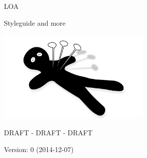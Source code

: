 \clearpage
\thispagestyle{empty}
\begin{centering}
\bfont
\Huge{LOA}
\vspace{2 cm}

\Large{Styleguide and more}

\vspace{5 cm}

\includegraphics[width= 7.5cm]{images/loa-logo}

\vspace{3 cm}

\large

DRAFT - DRAFT - DRAFT

Version: 0 (2014-12-07)


\end{centering}
\newpage
\setcounter{page}{1}

